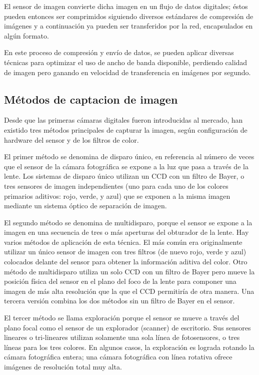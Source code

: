\documentclass[12pt,a4paper]{report}
\begin{document}
El sensor de imagen convierte dicha imagen en un flujo de datos
digitales; éstos pueden entonces ser comprimidos siguiendo diversos
estándares de compresión de imágenes y a continuación ya pueden
ser transferidos por la red, encapsulados en algún formato.

En este proceso de compresión y envío de datos, se pueden aplicar
diversas técnicas para optimizar el uso de ancho de banda disponible,
perdiendo calidad de imagen pero ganando en velocidad de
transferencia en imágenes por segundo.

\subsection{Métodos de captacion de imagen}

Desde que las primeras cámaras digitales fueron introducidas al mercado, han
existido tres métodos principales de capturar la imagen, según configuración de
hardware del sensor y de los filtros de color.

El primer método se denomina de disparo único, en referencia al número de veces
que el sensor de la cámara fotográfica se expone a la luz que pasa a través de
la lente. Los sistemas de disparo único utilizan un CCD con un filtro de Bayer,
o tres sensores de imagen independientes (uno para cada uno de los colores
primarios aditivos: rojo, verde, y azul) que se exponen a la misma imagen
mediante un sistema óptico de separación de imagen.

El segundo método se denomina de multidisparo, porque el sensor se expone a la
imagen en una secuencia de tres o más aperturas del obturador de la lente. Hay
varios métodos de aplicación de esta técnica. El más común era originalmente
utilizar un único sensor de imagen con tres filtros (de nuevo rojo, verde y
azul) colocados delante del sensor para obtener la información aditiva del
color. Otro método de multidisparo utiliza un solo CCD con un filtro de Bayer
pero mueve la posición física del sensor en el plano del foco de la lente para
componer una imagen de más alta resolución que la que el CCD permitiría de otra
manera. Una tercera versión combina los dos métodos sin un filtro de Bayer en el
sensor.

El tercer método se llama exploración porque el sensor se mueve a través del
plano focal como el sensor de un explorador (scanner) de escritorio. Sus
sensores lineares o tri-lineares utilizan solamente una sola línea de
fotosensores, o tres líneas para los tres colores. En algunos casos, la
exploración es lograda rotando la cámara fotográfica entera; una cámara
fotográfica con línea rotativa ofrece imágenes de resolución total muy alta.
\end{document}
